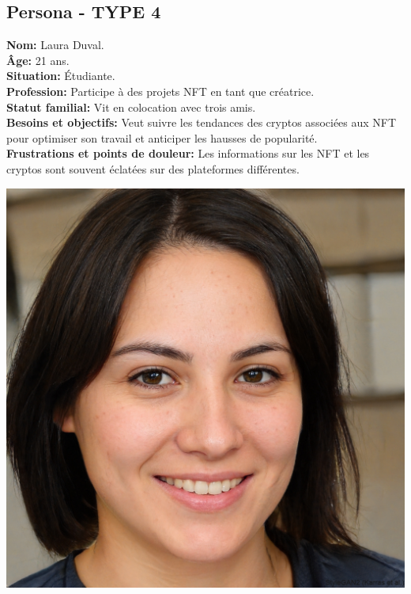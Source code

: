 \documentclass[a4paper,11pt]{article}
\begin{document}
\subsection{Persona - TYPE 4}
\begin{minipage}{0.6\textwidth} %
\textbf{Nom:} Laura Duval.\\
\textbf{Âge:} 21 ans.\\
\textbf{Situation:} Étudiante.\\
\textbf{Profession:} Participe à des projets NFT en tant que créatrice.\\
\textbf{Statut familial:} Vit en colocation avec trois amis.\\
\textbf{Besoins et objectifs:} Veut suivre les tendances des cryptos associées aux NFT pour optimiser son travail et anticiper les hausses de popularité.\\
\textbf{Frustrations et points de douleur:} Les informations sur les NFT et les cryptos sont souvent éclatées sur des plateformes différentes.\\
\end{minipage}%
\hspace{1cm}
\begin{minipage}{0.3\textwidth} %
    \begin{center}
        \includegraphics[width=\textwidth]{images/etudiante.jpeg} %
    \end{center}
\end{minipage}
\end{document}
